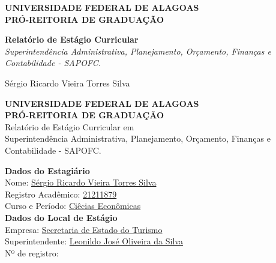 \documentclass[12pt,a4paper]{article}
\begin{document}
	
	\begin{titlepage}
		\centering
		\large
		\textbf{UNIVERSIDADE FEDERAL DE ALAGOAS} \\
		\textbf{PRÓ-REITORIA DE GRADUAÇÃO} \\
		\vfill
		
		\Huge \textbf{Relatório de Estágio Curricular} \\
		\vspace{0.5cm}
		\LARGE \textit{Superintendência Administrativa, Planejamento, Orçamento, Finanças e Contabilidade - SAPOFC.} \\
		\vfill
		
		\Large Sérgio Ricardo Vieira Torres Silva \\
		\vspace{1.5cm}
	\end{titlepage}
	
	\thispagestyle{empty}
	\begin{center}
		\textbf{UNIVERSIDADE FEDERAL DE ALAGOAS} \\
		\textbf{PRÓ-REITORIA DE GRADUAÇÃO}\\
		\vspace{1cm}
		{Relatório de Estágio Curricular em}\\
		{Superintendência Administrativa, Planejamento, Orçamento, Finanças e Contabilidade - SAPOFC.}
	\end{center}
	
	\vspace{1cm}
	
	\noindent \textbf{Dados do Estagiário} \\
	Nome: \underline{Sérgio Ricardo Vieira Torres Silva\hspace{0.2cm}} \\
	Registro Acadêmico: \underline{21211879\hspace{0.2cm}} \\
	Curso e Período: \underline{Ciêcias Econômicas\hspace{0.2cm}} \\
	
	\vspace{0.5cm}
	\noindent \textbf{Dados do Local de Estágio} \\
	Empresa: \underline{Secretaria de Estado do Turismo\hspace{0.2cm}} \\
	Superintendente: \underline{Leonildo José Oliveira da Silva\hspace{0.2cm}} \\
	Nº de registro: \underline{\hspace{0.2cm}} \\
	
\end{document}
